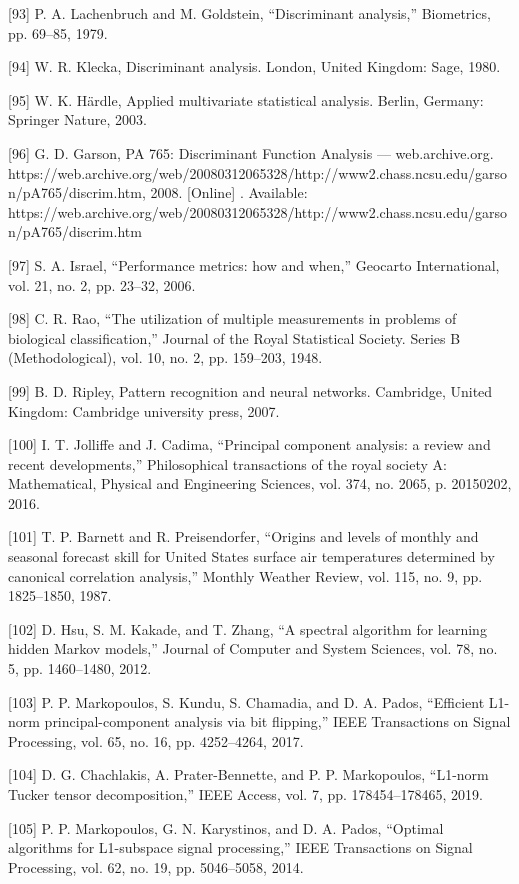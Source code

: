 \documentclass[sn-mathphys-num]{sn-jnl}%
\begin{document}
[93] P. A. Lachenbruch and M. Goldstein, “Discriminant analysis,” Biometrics, pp. 69–85, 1979.

[94] W. R. Klecka, Discriminant analysis. London, United Kingdom: Sage, 1980.

[95] W. K. Härdle, Applied multivariate statistical analysis. Berlin, Germany: Springer Nature, 2003.

[96] G. D. Garson, PA 765: Discriminant Function Analysis — web.archive.org. https://web.archive.org/web/20080312065328/http://www2.chass.ncsu.edu/garson/pA765/discrim.htm, 2008. [Online] . Available: https://web.archive.org/web/20080312065328/http://www2.chass.ncsu.edu/garson/pA765/discrim.htm

[97] S. A. Israel, “Performance metrics: how and when,” Geocarto International, vol. 21, no. 2, pp. 23–32, 2006.

[98] C. R. Rao, “The utilization of multiple measurements in problems of biological classification,” Journal of the Royal Statistical Society. Series B (Methodological), vol. 10, no. 2, pp. 159–203, 1948.

[99] B. D. Ripley, Pattern recognition and neural networks. Cambridge, United Kingdom: Cambridge university press, 2007.

[100] I. T. Jolliffe and J. Cadima, “Principal component analysis: a review and recent developments,” Philosophical transactions of the royal society A: Mathematical, Physical and Engineering Sciences, vol. 374, no. 2065, p. 20150202, 2016.

[101] T. P. Barnett and R. Preisendorfer, “Origins and levels of monthly and seasonal forecast skill for United States surface air temperatures determined by canonical correlation analysis,” Monthly Weather Review, vol. 115, no. 9, pp. 1825–1850, 1987.

[102] D. Hsu, S. M. Kakade, and T. Zhang, “A spectral algorithm for learning hidden Markov models,” Journal of Computer and System Sciences, vol. 78, no. 5, pp. 1460–1480, 2012.

[103] P. P. Markopoulos, S. Kundu, S. Chamadia, and D. A. Pados, “Efficient L1-norm principal-component analysis via bit flipping,” IEEE Transactions on Signal Processing, vol. 65, no. 16, pp. 4252–4264, 2017.

[104] D. G. Chachlakis, A. Prater-Bennette, and P. P. Markopoulos, “L1-norm Tucker tensor decomposition,” IEEE Access, vol. 7, pp. 178454–178465, 2019.

[105] P. P. Markopoulos, G. N. Karystinos, and D. A. Pados, “Optimal algorithms for L1-subspace signal processing,” IEEE Transactions on Signal Processing, vol. 62, no. 19, pp. 5046–5058, 2014.
\end{document}
